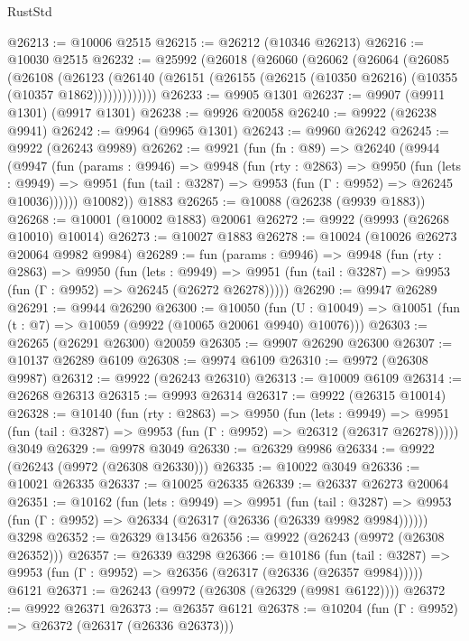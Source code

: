 \begin{lexlean}{RustStd}
\begin{coremodule}
@26213 := @10006 @2515
@26215 := @26212 (@10346 @26213)
@26216 := @10030 @2515
@26232 := @25992
    (@26018
      (@26060
        (@26062
          (@26064
            (@26085
              (@26108
                (@26123
                  (@26140 (@26151 (@26155 (@26215 (@10350 @26216) (@10355 (@10357 @1862)))))))))))))
@26233 := @9905 @1301
@26237 := @9907 (@9911 @1301) (@9917 @1301)
@26238 := @9926 @20058
@26240 := @9922 (@26238 @9941)
@26242 := @9964 (@9965 @1301)
@26243 := @9960 @26242
@26245 := @9922 (@26243 @9989)
@26262 := @9921
    (fun (fn : @89) =>
    @26240
      (@9944
        (@9947
          (fun (params : @9946) =>
          @9948
            (fun (rty : @2863) =>
            @9950
              (fun (lets : @9949) =>
              @9951 (fun (tail : @3287) => @9953 (fun (Γ : @9952) => @26245 @10036))))))
        @10082))
    @1883
@26265 := @10088 (@26238 (@9939 @1883))
@26268 := @10001 (@10002 @1883) @20061
@26272 := @9922 (@9993 (@26268 @10010) @10014)
@26273 := @10027 @1883
@26278 := @10024 (@10026 @26273 @20064 @9982 @9984)
@26289 := fun (params : @9946) =>
  @9948
    (fun (rty : @2863) =>
    @9950
      (fun (lets : @9949) =>
      @9951 (fun (tail : @3287) => @9953 (fun (Γ : @9952) => @26245 (@26272 @26278)))))
@26290 := @9947 @26289
@26291 := @9944 @26290
@26300 := @10050
    (fun (U : @10049) => @10051 (fun (t : @7) => @10059 (@9922 (@10065 @20061 @9940) @10076)))
@26303 := @26265 (@26291 @26300) @20059
@26305 := @9907 @26290 @26300
@26307 := @10137 @26289 @6109
@26308 := @9974 @6109
@26310 := @9972 (@26308 @9987)
@26312 := @9922 (@26243 @26310)
@26313 := @10009 @6109
@26314 := @26268 @26313
@26315 := @9993 @26314
@26317 := @9922 (@26315 @10014)
@26328 := @10140
    (fun (rty : @2863) =>
    @9950
      (fun (lets : @9949) =>
      @9951 (fun (tail : @3287) => @9953 (fun (Γ : @9952) => @26312 (@26317 @26278)))))
    @3049
@26329 := @9978 @3049
@26330 := @26329 @9986
@26334 := @9922 (@26243 (@9972 (@26308 @26330)))
@26335 := @10022 @3049
@26336 := @10021 @26335
@26337 := @10025 @26335
@26339 := @26337 @26273 @20064
@26351 := @10162
    (fun (lets : @9949) =>
    @9951
      (fun (tail : @3287) =>
      @9953 (fun (Γ : @9952) => @26334 (@26317 (@26336 (@26339 @9982 @9984))))))
    @3298
@26352 := @26329 @13456
@26356 := @9922 (@26243 (@9972 (@26308 @26352)))
@26357 := @26339 @3298
@26366 := @10186
    (fun (tail : @3287) => @9953 (fun (Γ : @9952) => @26356 (@26317 (@26336 (@26357 @9984)))))
    @6121
@26371 := @26243 (@9972 (@26308 (@26329 (@9981 @6122))))
@26372 := @9922 @26371
@26373 := @26357 @6121
@26378 := @10204 (fun (Γ : @9952) => @26372 (@26317 (@26336 @26373)))

\end{coremodule}
\end{lexlean}
